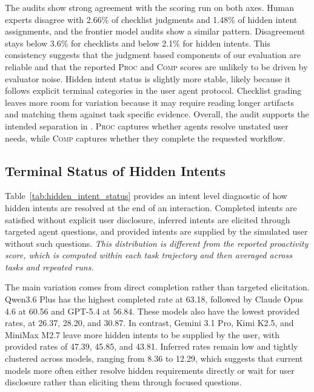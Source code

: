 The audits show strong agreement with the scoring run on both axes. Human experts disagree with 2.66\% of checklist judgments and 1.48\% of hidden intent assignments, and the frontier model audits show a similar pattern. Disagreement stays below 3.6\% for checklists and below 2.1\% for hidden intents. This consistency suggests that the judgment based components of our evaluation are reliable and that the reported \textsc{Proc} and \textsc{Comp} scores are unlikely to be driven by evaluator noise. Hidden intent status is slightly more stable, likely because it follows explicit terminal categories in the user agent protocol. Checklist grading leaves more room for variation because it may require reading longer artifacts and matching them against task specific evidence. Overall, the audit supports the intended separation in {\bench}. \textsc{Proc} captures whether agents resolve unstated user needs, while \textsc{Comp} captures whether they complete the requested workflow.

\subsection{Terminal Status of Hidden Intents}
\label{app:hidden_intents_status}



Table~\ref{tab:hidden_intent_status} provides an intent level diagnostic of how hidden intents are resolved at the end of an interaction. Completed intents are satisfied without explicit user disclosure, inferred intents are elicited through targeted agent questions, and provided intents are supplied by the simulated user without such questions. \textit{This distribution is different from the reported proactivity score, which is computed within each task trajectory and then averaged across tasks and repeated runs.}

The main variation comes from direct completion rather than targeted elicitation. Qwen3.6 Plus has the highest completed rate at 63.18, followed by Claude Opus 4.6 at 60.56 and GPT-5.4 at 56.84. These models also have the lowest provided rates, at 26.37, 28.20, and 30.87. In contrast, Gemini 3.1 Pro, Kimi K2.5, and MiniMax M2.7 leave more hidden intents to be supplied by the user, with provided rates of 47.39, 45.85, and 43.81. Inferred rates remain low and tightly clustered across models, ranging from 8.36 to 12.29, which suggests that current models more often either resolve hidden requirements directly or wait for user disclosure rather than eliciting them through focused questions.

